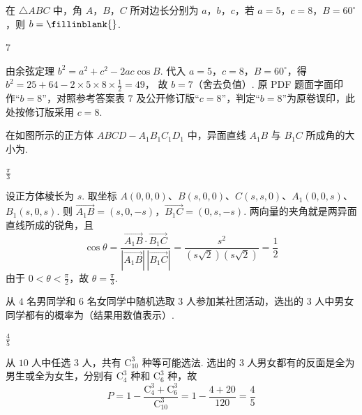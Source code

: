 \begin{problem}
在 \( \triangle ABC \) 中，角 \(A\)，\(B\)，\(C\) 所对边长分别为 \(a\)，\(b\)，\(c\)，若 \(a = 5\)，\(c = 8\)，\(B = 60^\circ\)，则 \( b =\fillinblank{}\).
\end{problem}

\begin{answer}
\(7\)
\end{answer}

\begin{solution}
由余弦定理
\(b^2=a^2+c^2-2ac\cos B\).
代入 \(a=5\)，\(c=8\)，\(B=60^\circ\)，得
\(b^2=25+64-2\times5\times8\times\frac12=49\)，
故 \(b=7\)（舍去负值）. 原 PDF 题面字面印作“\(b=8\)”，对照参考答案表 \(7\) 及公开修订版“\(c=8\)”，判定“\(b=8\)”为原卷误印，此处按修订版采用 \(c=8\).
\end{solution}

\begin{problem}
在如图所示的正方体 \( ABCD - A_{1}B_{1}C_{1}D_{1} \) 中，异面直线 \(A_{1}B\) 与 \(B_{1}C\) 所成角的大小为\fillinblank{}.

\end{problem}

\begin{answer}
\(\frac{\pi}{3}\)
\end{answer}

\begin{solution}
设正方体棱长为 \(s\). 取坐标 \(A(0,0,0)\)、\(B(s,0,0)\)、\(C(s,s,0)\)、\(A_1(0,0,s)\)、\(B_1(s,0,s)\). 则
\(\overrightarrow{A_1B}=(s,0,-s)\)，\(\overrightarrow{B_1C}=(0,s,-s)\).
两向量的夹角就是两异面直线所成的锐角，且
\[
\cos\theta=\frac{\overrightarrow{A_1B}\cdot\overrightarrow{B_1C}}{|\overrightarrow{A_1B}|\,|\overrightarrow{B_1C}|}
=\frac{s^2}{(s\sqrt2)(s\sqrt2)}=\frac12
\]
由于 \(0<\theta<\frac\pi2\)，故 \(\theta=\frac\pi3\).
\end{solution}

\begin{problem}
从 \(4\) 名男同学和 \(6\) 名女同学中随机选取 \(3\) 人参加某社团活动，选出的 \(3\) 人中男女同学都有的概率为\fillinblank{}（结果用数值表示）.
\end{problem}

\begin{answer}
\(\frac{4}{5}\)
\end{answer}

\begin{solution}
从 \(10\) 人中任选 \(3\) 人，共有 \(\mathrm C_{10}^{3}\) 种等可能选法. 选出的 \(3\) 人男女都有的反面是全为男生或全为女生，分别有 \(\mathrm C_4^3\) 种和 \(\mathrm C_6^3\) 种，故
\[
P=1-\frac{\mathrm C_4^3+\mathrm C_6^3}{\mathrm C_{10}^3}
=1-\frac{4+20}{120}=\frac45
\]
\end{solution}

